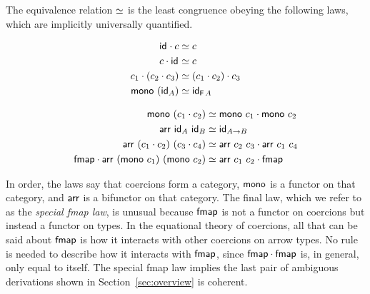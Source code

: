 \documentclass[acmsmall,screen]{acmart}
\begin{document}
\begin{definition}
  The equivalence relation \(\simeq\) is the least congruence obeying the following laws, which are implicitly universally quantified.\\
\begin{minipage}{0.4\textwidth}
\begin{align*}
\mathsf{id}_{} \cdot c &\simeq c \\
c \cdot \mathsf{id}_{} &\simeq c \\
c_1 \cdot (c_2 \cdot c_3) &\simeq (c_1 \cdot c_2) \cdot c_3 \\
\mathsf{mono}\ (\mathsf{id}_{A}) &\simeq \mathsf{id}_{\mathsf{F}\, A}
\end{align*}
\end{minipage}
\begin{minipage}{0.5\textwidth}
\begin{align*}
\mathsf{mono}\ (c_1 \cdot c_2) &\simeq \mathsf{mono}\ c_1 \cdot \mathsf{mono}\ c_2 \\
\mathsf{arr}\ \mathsf{id}_{A}\ \mathsf{id}_{B} &\simeq \mathsf{id}_{A \to B} \\
\mathsf{arr}\ (c_1 \cdot c_2)\ (c_3 \cdot c_4) &\simeq
\mathsf{arr}\ c_2\ c_3 \cdot \mathsf{arr}\ c_1\ c_4 \\
\mathsf{fmap} \cdot \mathsf{arr}\ (\mathsf{mono}\ c_1)\ (\mathsf{mono}\ c_2) &\simeq \mathsf{arr}\ c_1\ c_2 \cdot \mathsf{fmap}
\end{align*}
\end{minipage}
\end{definition}
In order, the laws say that coercions form a category, \(\mathsf{mono}\) is a functor
on that category, and \(\mathsf{arr}\) is a bifunctor on that category.  The final law,
which we refer to as the \emph{special fmap law}, is unusual because \(\mathsf{fmap}\)
is not a functor on coercions but instead a functor on types. In the equational
theory of coercions, all that can be said about \(\mathsf{fmap}{}\) is how it interacts
with other coercions on arrow types. No rule is needed to describe how it
interacts with \(\mathsf{fmap}{}\), since \(\mathsf{fmap} \cdot \mathsf{fmap}\) is, in general, only
equal to itself. The special fmap law implies the last pair of ambiguous derivations shown
in Section~\ref{sec:overview} is coherent.
\end{document}
